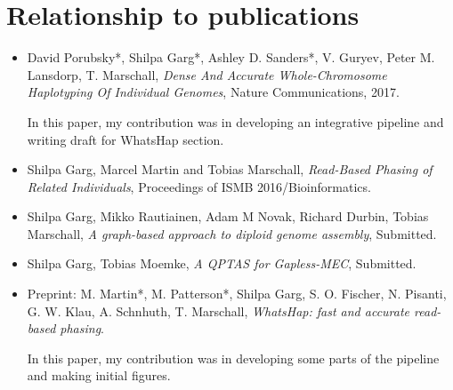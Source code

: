 \section{Relationship to publications}
\begin{itemize}
 \item David Porubsky*, Shilpa Garg*, Ashley D. Sanders*, V. Guryev, Peter M. Lansdorp, T. Marschall,
\textit{Dense And Accurate Whole-Chromosome Haplotyping Of Individual Genomes}, Nature Communications, 2017.

In this paper, my contribution was in developing an integrative pipeline and writing draft for WhatsHap section.
\item Shilpa Garg, Marcel Martin and Tobias Marschall, \textit{Read-Based Phasing of Related Individuals},
Proceedings of ISMB 2016/Bioinformatics.
\item Shilpa Garg, Mikko Rautiainen, Adam M Novak, Richard Durbin, Tobias Marschall, \textit{A graph-based approach to diploid genome assembly}, Submitted.
\item Shilpa Garg, Tobias Moemke, \textit{A QPTAS for Gapless-MEC}, Submitted.
\item Preprint: M. Martin*, M. Patterson*, Shilpa Garg, S. O. Fischer, N. Pisanti, G. W. Klau, A. Schnhuth, T.
Marschall, \textit{WhatsHap: fast and accurate read-based phasing}.

In this paper, my contribution was in developing some parts of the pipeline and making initial figures.
\end{itemize}





